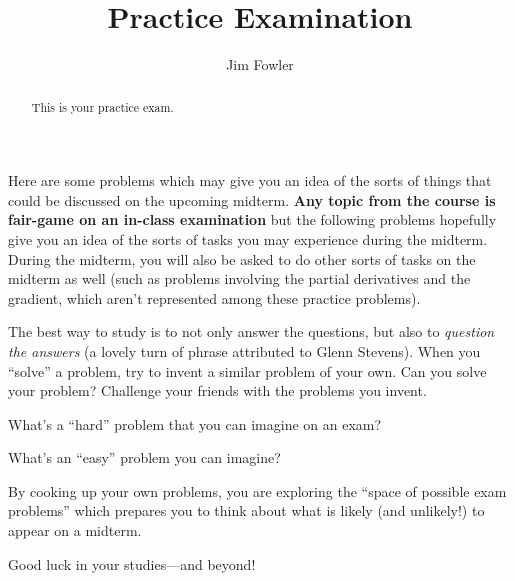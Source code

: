 \documentclass{ximera}
\author{Jim Fowler}
\title{Practice Examination}
\begin{document}
\begin{abstract}
  This is your practice exam.
\end{abstract}
\maketitle

Here are some problems which may give you an idea of the sorts of
things that could be discussed on the upcoming midterm.  \textbf{Any
  topic from the course is fair-game on an in-class examination} but
the following problems hopefully give you an idea of the sorts of
tasks you may experience during the midterm.  During the midterm, you
will also be asked to do other sorts of tasks on the midterm as well
(such as problems involving the partial derivatives and the gradient,
which aren't represented among these practice problems).

The best way to study is to not only answer the questions, but also to
\textit{question the answers} (a lovely turn of phrase attributed to
Glenn Stevens).  When you ``solve'' a problem, try to invent a similar
problem of your own.  Can you solve your problem?  Challenge your
friends with the problems you invent.

What's a ``hard'' problem that you can imagine on an exam?
\begin{freeResponse}
\end{freeResponse}

What's an ``easy'' problem you can imagine?
\begin{freeResponse}
\end{freeResponse}

By cooking up your own problems, you are exploring the ``space of
possible exam problems'' which prepares you to think about what is
likely (and unlikely!) to appear on a midterm.

Good luck in your studies---and beyond!
\end{document}
